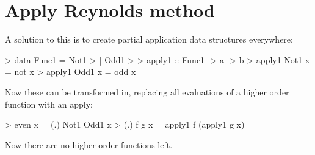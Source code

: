 \documentclass{article}
\begin{document}
\section{Apply Reynolds method}

A solution to this is to create partial application data structures everywhere:

\begin{code}
> data Func1 = Not1
>            | Odd1
>
> apply1 :: Func1 -> a -> b
> apply1 Not1 x = not x
> apply1 Odd1 x = odd x
\end{code}

Now these can be transformed in, replacing all evaluations of a higher order
function with an apply:

\begin{code}
> even x = (.) Not1 Odd1 x
> (.) f g x = apply1 f (apply1 g x)
\end{code}

Now there are no higher order functions left.
\end{document}
